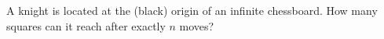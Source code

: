 A knight is located at the (black) origin of an infinite chessboard. How many squares can it reach after exactly $n$ moves?
